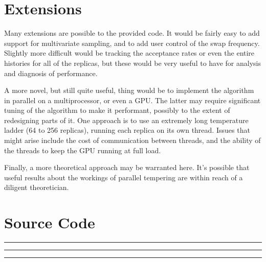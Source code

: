 \chapter*{Extensions}
Many extensions are possible to the provided code.
It would be fairly easy to add support for multivariate sampling,
and to add user control of the swap frequency.
Slightly more difficult would be tracking the acceptance rates or even the
entire histories for all of the replicas, but these would be very useful to
have for analysis and diagnosis of performance.

A more novel, but still quite useful, thing would be to implement the algorithm
in parallel on a multiprocessor, or even a GPU.
The latter may require significant tuning of the algorithm to make it
performant, possibly to the extent of redesigning parts of it.
One approach is to use an extremely long temperature ladder
(64 to 256 replicas), running each replica on its own thread.
Issues that might arise include the cost of communication between threads,
and the ability of the threads to keep the GPU running at full load.

Finally, a more theoretical approach may be warranted here.
It's possible that useful results about the workings of parallel tempering
are within reach of a diligent theoretician. 

\clearpage
\chapter*{Source Code}
\hrule

\hrule

\hrule



